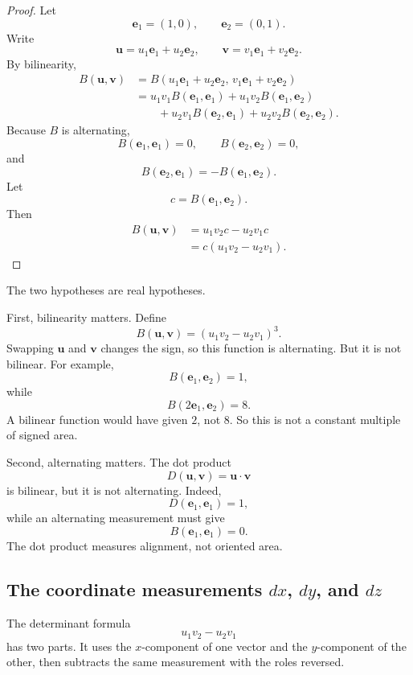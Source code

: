 \begin{proof}
Let
\[
    \mathbf e_1=(1,0),
    \qquad
    \mathbf e_2=(0,1).
\]
Write
\[
    \mathbf u=u_1\mathbf e_1+u_2\mathbf e_2,
    \qquad
    \mathbf v=v_1\mathbf e_1+v_2\mathbf e_2.
\]
By bilinearity,
\[
\begin{aligned}
B(\mathbf u,\mathbf v)
&=
B(u_1\mathbf e_1+u_2\mathbf e_2,\,
  v_1\mathbf e_1+v_2\mathbf e_2)\\
&=
u_1v_1B(\mathbf e_1,\mathbf e_1)
+u_1v_2B(\mathbf e_1,\mathbf e_2)\\
&\qquad
+u_2v_1B(\mathbf e_2,\mathbf e_1)
+u_2v_2B(\mathbf e_2,\mathbf e_2).
\end{aligned}
\]
Because \(B\) is alternating,
\[
    B(\mathbf e_1,\mathbf e_1)=0,
    \qquad
    B(\mathbf e_2,\mathbf e_2)=0,
\]
and
\[
    B(\mathbf e_2,\mathbf e_1)
    =
    -B(\mathbf e_1,\mathbf e_2).
\]
Let
\[
    c=B(\mathbf e_1,\mathbf e_2).
\]
Then
\[
\begin{aligned}
B(\mathbf u,\mathbf v)
&=
u_1v_2c-u_2v_1c\\
&=
c(u_1v_2-u_2v_1).
\end{aligned}
\]
\end{proof}

The two hypotheses are real hypotheses.

First, bilinearity matters.  Define
\[
    B(\mathbf u,\mathbf v)
    =
    (u_1v_2-u_2v_1)^3.
\]
Swapping \(\mathbf u\) and \(\mathbf v\) changes the sign, so this function is
alternating.  But it is not bilinear.  For example,
\[
    B(\mathbf e_1,\mathbf e_2)=1,
\]
while
\[
    B(2\mathbf e_1,\mathbf e_2)=8.
\]
A bilinear function would have given \(2\), not \(8\).  So this is not a constant
multiple of signed area.

Second, alternating matters.  The dot product
\[
    D(\mathbf u,\mathbf v)=\mathbf u\cdot\mathbf v
\]
is bilinear, but it is not alternating.  Indeed,
\[
    D(\mathbf e_1,\mathbf e_1)=1,
\]
while an alternating measurement must give
\[
    B(\mathbf e_1,\mathbf e_1)=0.
\]
The dot product measures alignment, not oriented area.

\subsection{The coordinate measurements \(dx\), \(dy\), and \(dz\)}

The determinant formula
\[
    u_1v_2-u_2v_1
\]
has two parts.  It uses the \(x\)-component of one vector and the \(y\)-component of
the other, then subtracts the same measurement with the roles reversed.

